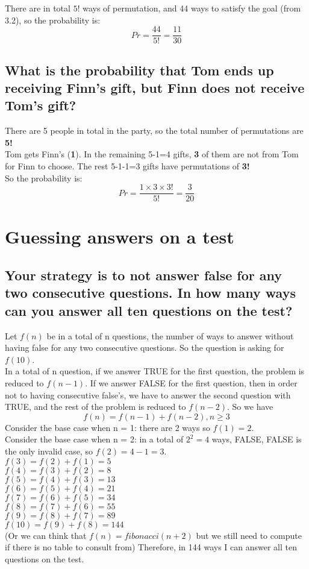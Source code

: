 \documentclass{article}
\begin{document}
There are in total \( 5! \) ways of permutation, and 44 ways to satisfy the goal (from 3.2), so the probability is:
\[
Pr = \frac{44}{5!} = \frac{11}{30}
\]

\subsection{What is the probability that Tom ends up receiving Finn's gift, but Finn does not receive Tom's gift?}

There are 5 people in total in the party, so the total number of permutations are \textbf{5!} \\
Tom gets Finn's (\textbf{1}). In the remaining 5-1=4 gifts, \textbf{3} of them are not from Tom for Finn to choose. The rest 5-1-1=3 gifts have permutations of \textbf{3!}\\
So the probability is:
\[
Pr = \frac{1 \times 3 \times 3! }{5!} = \frac{3}{20}
\]

\section{Guessing answers on a test}

\subsection{Your strategy is to not answer false for any two consecutive questions. In how many ways can you answer all ten questions on the test?}

Let \( f(n) \) be in a total of n questions, the number of ways to answer without having false for any two consecutive questions. So the question is asking for \( f(10) \). \\
In a total of n question, if we answer TRUE for the first question, the problem is reduced to \( f(n-1) \). If we answer FALSE for the first question, then in order not to having consecutive false's, we have to answer the second question with TRUE, and the rest of the problem is reduced to \( f(n-2) \). So we have 
\[
f(n) = f(n-1) + f(n-2), n \geq 3 
\]
Consider the base case when n = 1: there are 2 ways so \( f(1) = 2 \). \\
Consider the base case when n = 2: in a total of \( 2^2 = 4 \) ways, FALSE, FALSE is the only invalid case, so \( f(2) = 4 - 1 = 3\). \\
\( f(3) = f(2) + f(1) = 5 \) \\ 
\( f(4) = f(3) + f(2) = 8 \) \\ 
\( f(5) = f(4) + f(3) = 13 \) \\ 
\( f(6) = f(5) + f(4) = 21 \) \\ 
\( f(7) = f(6) + f(5) = 34 \) \\ 
\( f(8) = f(7) + f(6) = 55 \) \\ 
\( f(9) = f(8) + f(7) = 89 \) \\ 
\( f(10) = f(9) + f(8) = 144 \) \\
 (Or we can think that \(f(n) = fibonacci(n+2) \) but we still need to compute if there is no table to consult from)
 Therefore, in 144 ways I can answer all ten questions on the test.
\end{document}
